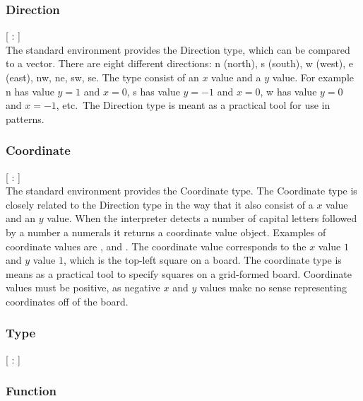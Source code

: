 \subsubsection{Direction}
\begin{dlist}
  \item {}[ : ]\\
  The standard environment provides the Direction type, which can be compared to a vector. There are eight different directions: n (north), s (south), w (west), e (east), nw, ne, sw, se. The type consist of an $x$ value and a $y$ value. For example n has value $y = 1$ and $x = 0$, s has value $y = -1$ and $x = 0$, w has value $y = 0$ and $x = -1$, etc.\ The Direction type is meant as a practical tool for use in patterns. 
\end{dlist}

\subsubsection{Coordinate}
\begin{dlist}
  \item {}[ : ]\\
    The standard environment provides the Coordinate type. The Coordinate type is closely related to the Direction type in the way that it also consist of a $x$ value and an $y$ value. When the interpreter detects a number of capital letters followed by a number a numerals it returns a coordinate value object. Examples of coordinate values are ,  and . The coordinate value  corresponds to the $x$ value $1$ and $y$ value $1$, which is the top-left square on a board. The coordinate type is means as a practical tool to specify squares on a grid-formed board. Coordinate values must be positive, as negative $x$ and $y$ values make no sense representing coordinates off of the board.
\end{dlist}
\subsubsection{Type}
\begin{dlist}
  \item {}[ : ]\\
\end{dlist}
\subsubsection{Function}

